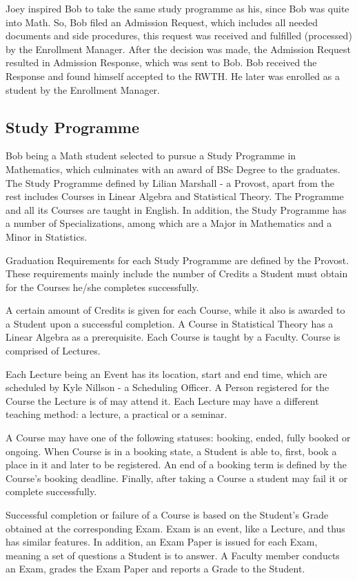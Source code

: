 \documentclass{article}    %
\begin{document}
Joey inspired Bob to take the same study programme as his, since Bob was quite into Math. So, Bob filed an Admission Request, which includes all needed documents and side procedures, this request was received and fulfilled (processed) by the Enrollment Manager. After the decision was made, the Admission Request resulted in Admission Response, which was sent to Bob. Bob received the Response and found himself accepted to the RWTH. He later was enrolled as a student by the Enrollment Manager. 
% 
\subsection{Study Programme}
%
Bob being a Math student selected to pursue a Study Programme in Mathematics, which culminates with an award of BSc Degree to the graduates. The Study Programme defined by Lilian Marshall - a Provost, apart from the rest includes Courses in Linear Algebra and Statistical Theory. The Programme and all its Courses are taught in English. In addition, the Study Programme has a number of Specializations, among which are a Major in Mathematics and a Minor in Statistics.

Graduation Requirements for each Study Programme are defined by the Provost. These requirements mainly include the number of Credits a Student must obtain for the Courses he/she completes successfully.

A certain amount of Credits is given for each Course, while it also is awarded to a Student upon a successful completion. A Course in Statistical Theory has a Linear Algebra as a prerequisite. Each Course is taught by a Faculty. Course is comprised of Lectures.

Each Lecture being an Event has its location, start and end time, which are scheduled by Kyle Nillson - a Scheduling Officer. A Person registered for the Course the Lecture is of may attend it. Each Lecture may have a different teaching method: a lecture, a practical or a seminar.

A Course may have one of the following statuses: booking, ended, fully booked or ongoing. When Course is in a booking state, a Student is able to, first, book a place in it and later to be registered. An end of a booking term is defined by the Course's booking deadline. Finally, after taking a Course a student may fail it or complete successfully.

Successful completion or failure of a Course is based on the Student's Grade obtained at the corresponding Exam. Exam is an event, like a Lecture, and thus has similar features. In addition, an Exam Paper is issued for each Exam, meaning a set of questions a Student is to answer. A Faculty member conducts an Exam, grades the Exam Paper and reports a Grade to the Student.
\end{document}
